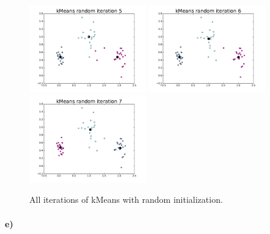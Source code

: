 \documentclass[12pt]{article}
\begin{document}
\begin{figure}[h]
\begin{adjustwidth}{-2in}{-2in}
\begin{center}
                        \includegraphics[width=0.45\textwidth]{kMeansrandomiteration5}
                        \includegraphics[width=0.45\textwidth]{kMeansrandomiteration6}
                        \includegraphics[width=0.45\textwidth]{kMeansrandomiteration7}
                        \caption{All iterations of kMeans with random initialization.}
                \end{center}
        \end{adjustwidth}
\end{figure}
\clearpage

\paragraph{e)}
\end{document}
